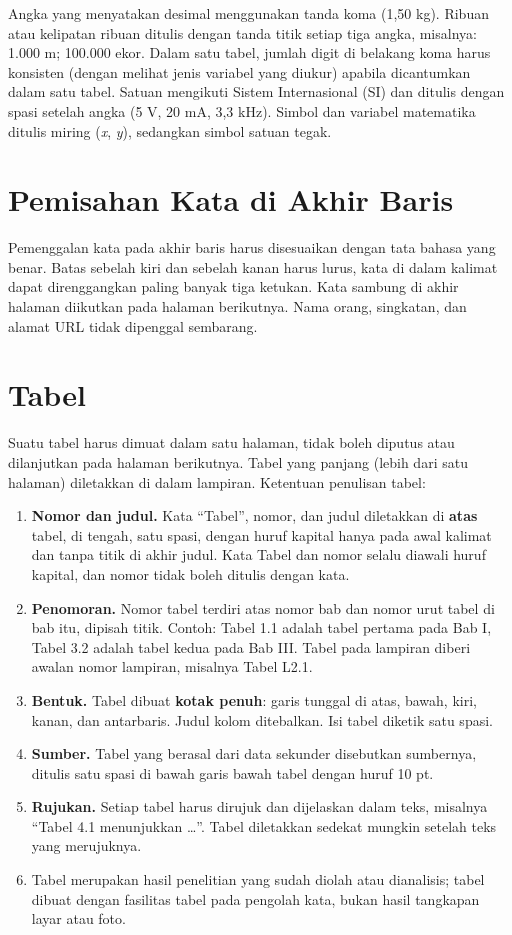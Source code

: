 Angka yang menyatakan desimal menggunakan tanda koma (1,50 kg). Ribuan atau kelipatan ribuan ditulis dengan tanda titik setiap tiga angka, misalnya: 1.000 m; 100.000 ekor. Dalam satu tabel, jumlah digit di belakang koma harus konsisten (dengan melihat jenis variabel yang diukur) apabila dicantumkan dalam satu tabel. Satuan mengikuti Sistem Internasional (SI) dan ditulis dengan spasi setelah angka (5 V, 20 mA, 3,3 kHz). Simbol dan variabel matematika ditulis miring (\textit{x}, \textit{y}), sedangkan simbol satuan tegak.

\section{Pemisahan Kata di Akhir Baris}
Pemenggalan kata pada akhir baris harus disesuaikan dengan tata bahasa yang benar. Batas sebelah kiri dan sebelah kanan harus lurus, kata di dalam kalimat dapat direnggangkan paling banyak tiga ketukan. Kata sambung di akhir halaman diikutkan pada halaman berikutnya. Nama orang, singkatan, dan alamat URL tidak dipenggal sembarang.

\section{Tabel}
Suatu tabel harus dimuat dalam satu halaman, tidak boleh diputus atau dilanjutkan pada halaman berikutnya. Tabel yang panjang (lebih dari satu halaman) diletakkan di dalam lampiran. Ketentuan penulisan tabel:
\begin{enumerate}
\item \textbf{Nomor dan judul.} Kata “Tabel”, nomor, dan judul diletakkan di \textbf{atas} tabel, di tengah, satu spasi, dengan huruf kapital hanya pada awal kalimat dan tanpa titik di akhir judul. Kata Tabel dan nomor selalu diawali huruf kapital, dan nomor tidak boleh ditulis dengan kata.
\item \textbf{Penomoran.} Nomor tabel terdiri atas nomor bab dan nomor urut tabel di bab itu, dipisah titik. Contoh: Tabel 1.1 adalah tabel pertama pada Bab I, Tabel 3.2 adalah tabel kedua pada Bab III. Tabel pada lampiran diberi awalan nomor lampiran, misalnya Tabel L2.1.
\item \textbf{Bentuk.} Tabel dibuat \textbf{kotak penuh}: garis tunggal di atas, bawah, kiri, kanan, dan antarbaris. Judul kolom ditebalkan. Isi tabel diketik satu spasi.
\item \textbf{Sumber.} Tabel yang berasal dari data sekunder disebutkan sumbernya, ditulis satu spasi di bawah garis bawah tabel dengan huruf 10 pt.
\item \textbf{Rujukan.} Setiap tabel harus dirujuk dan dijelaskan dalam teks, misalnya “Tabel 4.1 menunjukkan …”. Tabel diletakkan sedekat mungkin setelah teks yang merujuknya.
\item Tabel merupakan hasil penelitian yang sudah diolah atau dianalisis; tabel dibuat dengan fasilitas tabel pada pengolah kata, bukan hasil tangkapan layar atau foto.
\end{enumerate}

